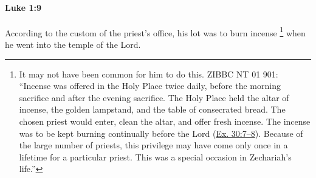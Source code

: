 			\begin{framed}
			\scriptsize
				\begin{compactdesc}
					\item[SBLG] 
				\end{compactdesc}
			\end{framed}

		\paragraph{Luke 1:9} %
			\label{LUKE-1-9}

			According to the custom of the priest's office, his lot was to burn incense%
				\footnote{%
					It may not have been common for him to do this. ZIBBC NT 01 901: ``Incense was offered in the Holy Place twice daily, before the morning sacrifice and after the evening sacrifice. The Holy Place held the altar of incense, the golden lampstand, and the table of consecrated bread. The chosen priest would enter, clean the altar, and offer fresh incense. The incense was to be kept burning continually before the Lord (\hyperref[EXODUS-30-7]{Ex. 30:7--8}). Because of the large number of priests, this privilege may have come only once in a lifetime for a particular priest. This was a special occasion in Zechariah's life.''
					}
			when he went into the temple of the Lord.

